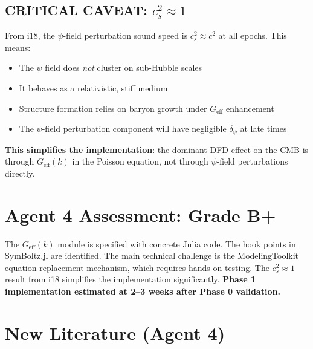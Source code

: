 \documentclass[11pt,a4paper]{article}
\begin{document}
\subsection{CRITICAL CAVEAT: $c_s^2 \approx 1$}

From i18, the $\psi$-field perturbation sound speed is $c_s^2 \approx c^2$ at all epochs. This means:
\begin{itemize}
\item The $\psi$ field does \emph{not} cluster on sub-Hubble scales
\item It behaves as a relativistic, stiff medium
\item Structure formation relies on baryon growth under $G_{\mathrm{eff}}$ enhancement
\item The $\psi$-field perturbation component will have negligible $\delta_\psi$ at late times
\end{itemize}

\textbf{This simplifies the implementation}: the dominant DFD effect on the CMB is through $G_{\mathrm{eff}}(k)$ in the Poisson equation, not through $\psi$-field perturbations directly.

\section{Agent 4 Assessment: Grade B+}

The $G_{\mathrm{eff}}(k)$ module is specified with concrete Julia code. The hook points in SymBoltz.jl are identified. The main technical challenge is the ModelingToolkit equation replacement mechanism, which requires hands-on testing. The $c_s^2 \approx 1$ result from i18 simplifies the implementation significantly. \textbf{Phase 1 implementation estimated at 2--3 weeks after Phase 0 validation.}

\section{New Literature (Agent 4)}
\end{document}
